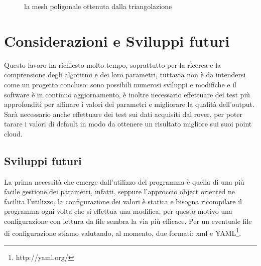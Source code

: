 \documentclass[a4paper,12pt]{article}
\begin{document}
	\begin{figure}
	\centering
	\caption{la mesh poligonale ottenuta dalla triangolazione}
	\label{output}
	\end{figure}
	\clearpage
	
	
\section{Considerazioni e Sviluppi futuri}
Questo lavoro ha richiesto molto tempo, soprattutto per la ricerca e la comprensione degli algoritmi e dei loro 
parametri, tuttavia non è da intendersi come un progetto concluso:
sono possibili numerosi sviluppi e modifiche e il software è in continuo aggiornamento, è inoltre necessario 
effettuare dei test più approfonditi per affinare i valori dei parametri e migliorare la qualità dell'output.
Sarà necessario anche effettuare dei test sui dati acquisiti dal rover, per poter tarare i valori di default
in modo da ottenere un risultato migliore sui suoi point cloud.
	\subsection{Sviluppi futuri}
	La prima necessità che emerge dall'utilizzo del programma è quella di una più facile gestione dei parametri, 
	infatti, seppure l'approccio object oriented ne facilita l'utilizzo, la configurazione dei valori è statica e
	bisogna ricompilare il programma ogni volta che si effettua una modifica, per questo motivo una configurazione
	con lettura da file sembra la via più efficace. Per un eventuale file di configurazione stiamo valutando, 
	al momento, due formati: xml e YAML\footnote{http://yaml.org/}.
	
\end{document}
